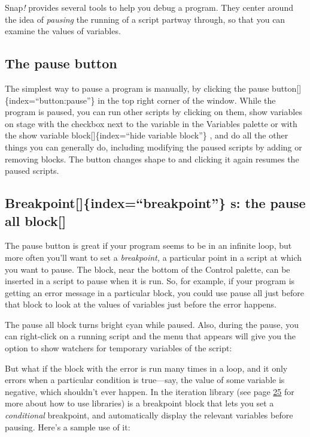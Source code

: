 \documentclass[
  letterpaper,
]{book}
\begin{document}
Snap\emph{!} provides several tools to help you debug a program. They
center around the idea of \emph{pausing} the running of a script partway
through, so that you can examine the values of variables.

\subsection{The pause button}\label{the-pause-button}

The simplest way to pause a program is manually, by clicking the pause
button{[}{]}\{index=``button:pause''\} in the top right corner of the
window. While the program is paused, you can run other scripts by
clicking on them, show variables on stage with the checkbox next to the
variable in the Variables palette or with the show variable
block{[}{]}\{index=``hide variable block''\} , and do all the other
things you can generally do, including modifying the paused scripts by
adding or removing blocks. The button changes shape to and clicking it
again resumes the paused scripts.

\subsection{Breakpoint{[}{]}\{index=``breakpoint''\} s: the pause all
block{[}{]}}\label{breakpointindexbreakpoint-s-the-pause-all-block}

\label{pause_all}{}The pause button is great if your
program seems to be in an infinite loop, but more often you'll want to
set a \emph{breakpoint,} a particular point in a script at which you
want to pause. The block, near the bottom of the Control palette, can be
inserted in a script to pause when it is run. So, for example, if your
program is getting an error message in a particular block, you could use
pause all just before that block to look at the values of variables just
before the error happens.

The pause all block turns bright cyan while paused. Also, during the
pause, you can right-click on a running script and the menu that appears
will give you the option to show watchers for temporary variables of the
script:

But what if the block with the error is run many times in a loop, and it
only errors when a particular condition is true---say, the value of some
variable is negative, which shouldn't ever happen. In the iteration
library (see page \hyperref[libraries-1]{25} for more about how to use
libraries) is a breakpoint block that lets you set a \emph{conditional}
breakpoint, and automatically display the relevant variables before
pausing. Here's a sample use of it:
\end{document}
